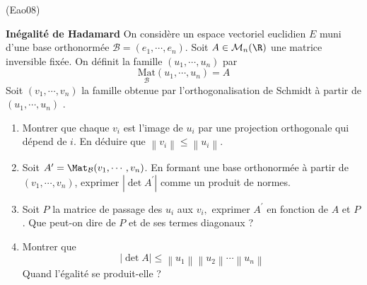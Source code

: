 \begin{tiny}(Eao08)\end{tiny} \textbf{In{\'e}galit{\'e} de Hadamard}\newline
On consid{\`e}re un espace vectoriel euclidien $E$ muni d'une base orthonorm{\'e}e $\mathcal{B}=(e_{1},\cdots ,e_{n})$. Soit $A\in \mathcal{M}_{n}(\R)$ une matrice inversible fix{\'e}e. On d{\'e}finit la famille $(u_{1},\cdots ,u_{n})$ par
\begin{displaymath}
\underset{\mathcal{B}}{\text{Mat}}(u_{1},\cdots,u_{n})=A  
\end{displaymath}
Soit $(v_{1},\cdots ,v_{n})$ la famille obtenue par l'orthogonalisation de Schmidt {\`a} partir de $(u_{1},\cdots ,u_{n})$ .
\begin{enumerate}
\item  Montrer que chaque $v_{i}$ est l'image de $u_{i}$ par une projection
orthogonale qui d{\'e}pend de $i$. En d{\'e}duire que $\left\| v_{i}\right\|
\leq \left\| u_{i}\right\| $.

\item  Soit $A^{\prime }=\Mat_{\mathcal{B}}(v_{1},\cdots ,v_{n})$. En formant une base orthonormée à partir de $(v_{1},\cdots ,v_{n})$, exprimer $\left| \det A^{\prime }\right|$ comme un produit de normes.

\item  Soit $P$ la matrice de passage des $u_{i}$ aux $v_{i},$ exprimer $%
A^{\prime }$ en fonction de $A$ et $P$. Que peut-on dire de $P$ et de ses termes diagonaux ?

\item  Montrer que
\[
\left| \det A\right| \leq \left\| u_{1}\right\| \left\| u_{2}\right\| \cdots
\left\| u_{n}\right\|
\]
Quand l'{\'e}galit{\'e} se produit-elle ?
\end{enumerate}
